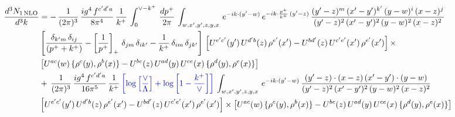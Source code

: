 \documentclass[9pt]{article}
\numberwithin{equation}{section}
\begin{document}
\begin{align}
     \frac{d^{3}N_{1\,\rm NLO}}{d^{3}k} & = -\,\frac{1}{(2\pi)^{3}}\, \frac{ig^{4}\,f^{c'd'a}}{8\pi^{4}}\, \frac{1}{k^{+}}\,\int_{0}^{\vee-k^{+}}\,  \frac{dp^{+}}{2\pi}\, \int_{w,x',y',z,y,x}\, e^{-ik\cdot (y'-w)}\, e^{-ik\cdot \frac{p^{+}}{k^{+}}\,(y'-z)}\,\frac{(y'-z)^{m}\,(x'-y')^{k'}\,(y-w)^{i}\,(x-z)^{j}}{(y'-z)^{2}\,(x'-y')^{2}\,(y-w)^{2}\,(x-z)^{2}}\notag \\ & \left[\frac{\delta_{k'm}\,\delta_{ij}}{(p^{+}+k^{+})}-\left[\frac{1}{p^{+}}\right]_{+}\,\delta_{jm}\,\delta_{ik'}-\frac{1}{k^{+}}\, \delta_{im}\, \delta_{jk'}\right]\, \left[U^{e'c'}(y')\,U^{d'b}(z)\,\rho^{e'}(x')-U^{bd'}(z)\,U^{c'e'}(x')\,\rho^{e'}(x')\right]\times\notag \\ &  \left[U^{ac}(w)\, \{\rho^{c}(y),\rho^{b}(x)\}-U^{bc}(z)\,U^{ad}(y)\,U^{ce}(x)\,\{\rho^{d}(y),\rho^{e}(x)\}\right]\notag \\ & +\,\frac{1}{(2\pi)^{3}}\, \frac{ig^{4}\,f^{c'd'a}}{16\pi^{5}}\, \frac{1}{k^{+}}\,{\color{blue}\left[\log{\left[\frac{\vee}{\Lambda}\right]} + \log{\left[1-\frac{k^{+}}{\vee}\right]}\right]}\, \int_{w,x',y',z,y,x}\, e^{-ik\cdot (y'-w)}\,\frac{(y'-z)\cdot (x-z)\,(x'-y')\cdot (y-w)}{(y'-z)^{2}\,(x'-y')^{2}\,(y-w)^{2}\,(x-z)^{2}}\notag \\ &  \left[U^{e'c'}(y')\,U^{d'b}(z)\,\rho^{e'}(x')-U^{bd'}(z)\,U^{c'e'}(x')\,\rho^{e'}(x')\right]\times  \left[U^{ac}(w)\, \{\rho^{c}(y),\rho^{b}(x)\}-U^{bc}(z)\,U^{ad}(y)\,U^{ce}(x)\,\{\rho^{d}(y),\rho^{e}(x)\}\right]
\end{align} 
\end{document}

